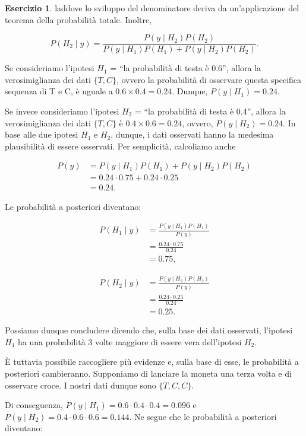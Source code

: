 \documentclass[
  11pt,
]{krantz}
\theoremstyle{definition}
\theoremstyle{definition}
\theoremstyle{definition}
\newtheorem{exercise}{Esercizio}[chapter]
\theoremstyle{definition}
\theoremstyle{remark}
\begin{document}
\begin{exercise}
laddove lo sviluppo del denominatore deriva da un'applicazione del teorema della probabilità totale. Inoltre,

\[
P(H_2 \mid y) = \frac{P(y \mid H_2) P(H_2)}{P(y \mid H_1) P(H_1) + P(y \mid H_2) P(H_2)}.
\]

Se consideriamo l'ipotesi \(H_1\) = ``la probabilità di testa è 0.6'', allora la verosimiglianza dei dati \(\{T, C\}\), ovvero la probabilità di osservare questa specifica sequenza di T e C, è uguale a \(0.6 \times 0.4 = 0.24.\) Dunque, \(P(y \mid H_1) = 0.24\).

Se invece consideriamo l'ipotesi \(H_2\) = ``la probabilità di testa è 0.4'', allora la verosimiglianza dei dati \(\{T, C\}\) è \(0.4 \times 0.6 = 0.24\), ovvero, \(P(y \mid H_2) = 0.24\). In base alle due ipotesi \(H_1\) e \(H_2\), dunque, i dati osservati hanno la medesima plausibilità di essere osservati. Per semplicità, calcoliamo anche

\[
\begin{split}
P(y) &= P(y \mid H_1) P(H_1) + P(y \mid H_2) P(H_2) \\
&= 0.24 \cdot 0.75 + 0.24 \cdot 0.25 \\
&= 0.24.
\end{split}
\]

Le probabilità a posteriori diventano:

\[
\begin{split}
P(H_1 \mid y) &= \frac{P(y \mid H_1) P(H_1)}{P(y)}\\
&= \frac{0.24 \cdot 0.75}{0.24} \\
&= 0.75,
\end{split}
\]

\[
\begin{split}
P(H_2 \mid y) &= \frac{P(y \mid H_2) P(H_2)}{P(y)} \\
&= \frac{0.24 \cdot 0.25}{0.24} \\
&= 0.25.
\end{split}
\]

Possiamo dunque concludere dicendo che, sulla base dei dati osservati, l'ipotesi \(H_1\) ha una probabilità 3 volte maggiore di essere vera dell'ipotesi \(H_2\).

È tuttavia possibile raccogliere più evidenze e, sulla base di esse, le probabilità a posteriori cambieranno. Supponiamo di lanciare la moneta una terza volta e di osservare croce. I nostri dati dunque sono \(\{T, C, C\}\).

Di conseguenza, \(P(y \mid H_1) = 0.6 \cdot 0.4 \cdot 0.4 = 0.096\) e \(P(y \mid H_2) = 0.4 \cdot 0.6 \cdot 0.6 = 0.144\). Ne segue che le probabilità a posteriori diventano:


\end{exercise}
\end{document}
